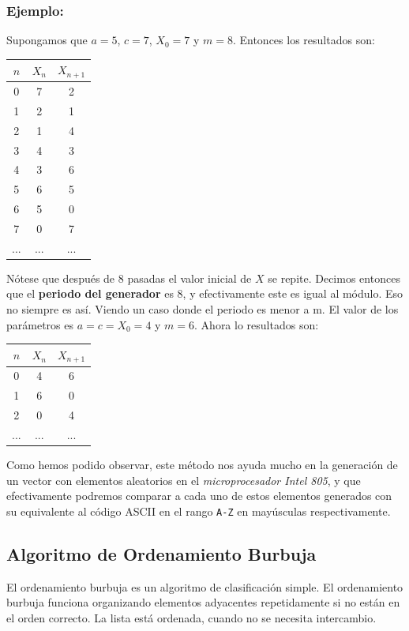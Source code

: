 \documentclass[doc, donotrepeattitle, biblatex, apacite]{apa6}
\begin{document}
\subsubsection{Ejemplo:}
Supongamos que $a=5$, $c= 7$, $X_{0}=7$ y $m=8$. Entonces los resultados son:
\begin{center}
	\begin{tabular}{|c|c|c|}
		\hline
		$n$ & $X_{n}$ & $X_{n+1}$
		\\ \hline
		0 & 7 & 2
		\\
		1 & 2 & 1
		\\
		2  & 1 & 4
		\\
		3 & 4 & 3
		\\
		4 & 3 & 6
		\\
		5 & 6 & 5
		\\
		6 & 5 & 0
		\\
		7 & 0 & 7
		\\
		... & ... & ...
		\\
		\hline
	\end{tabular}
\end{center}

Nótese que después de 8 pasadas el valor inicial de $X$ se repite. Decimos entonces que el \textbf{periodo del
generador} es 8, y efectivamente este es igual al módulo. Eso no siempre es así. Viendo un caso donde el
periodo es menor a m. El valor de los parámetros es $a=c=X_{0}=4$ y $m=6$. Ahora lo resultados son:
\begin{center}
	\begin{tabular}{|c|c|c|}
		\hline
		$n$ & $X_{n}$ & $X_{n+1}$
		\\ \hline
		0 & 4 & 6
		\\
		1 & 6 & 0
		\\
		2 & 0 & 4
		\\
		... & ... & ...
		\\
		\hline
	\end{tabular}
\end{center}

Como hemos podido observar, este método nos ayuda mucho en la generación de un vector con
elementos aleatorios en el \textit{microprocesador Intel 805}, y que efectivamente podremos comparar a cada
uno de estos elementos generados con su equivalente al código ASCII en el rango \texttt{A-Z} en mayúsculas
respectivamente.

\subsection{Algoritmo de Ordenamiento Burbuja}
El ordenamiento burbuja es un algoritmo de clasificación simple. El ordenamiento burbuja
funciona organizando elementos adyacentes repetidamente si no están en el orden correcto. La lista está
ordenada, cuando no se necesita intercambio.
\end{document}
